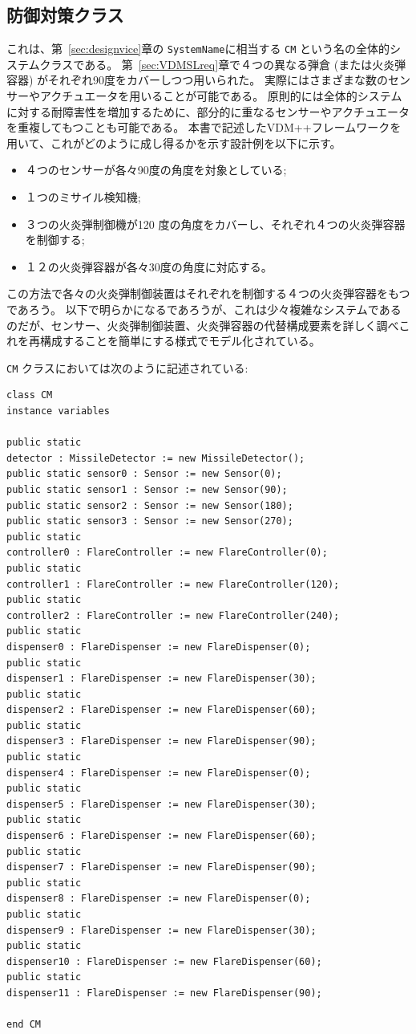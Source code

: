 \documentclass[\pformat,12pt]{jreport}
\begin{document}
\subsection{防御対策クラス}

これは、第~\ref{sec:designvice}章の \texttt{SystemName}に相当する \texttt{CM} という名の全体的システムクラスである。
第~\ref{sec:VDMSLreq}章で４つの異なる弾倉 (または火炎弾容器) がそれぞれ90度をカバーしつつ用いられた。
実際にはさまざまな数のセンサーやアクチュエータを用いることが可能である。
原則的には全体的システムに対する耐障害性を増加するために、部分的に重なるセンサーやアクチュエータを重複してもつことも可能である。
本書で記述したVDM++フレームワークを用いて、これがどのように成し得るかを示す設計例を以下に示す。
\begin{itemize}
\item ４つのセンサーが各々90度の角度を対象としている;
\item １つのミサイル検知機;
\item ３つの火炎弾制御機が120 度の角度をカバーし、それぞれ４つの火炎弾容器を制御する;
\item １２の火炎弾容器が各々30度の角度に対応する。
\end{itemize}

この方法で各々の火炎弾制御装置はそれぞれを制御する４つの火炎弾容器をもつであろう。
以下で明らかになるであろうが、これは少々複雑なシステムであるのだが、センサー、火炎弾制御装置、火炎弾容器の代替構成要素を詳しく調べこれを再構成することを簡単にする様式でモデル化されている。

\texttt{CM} クラスにおいては次のように記述されている:
\newpage

\begin{lstlisting}
class CM
instance variables

public static 
detector : MissileDetector := new MissileDetector();
public static sensor0 : Sensor := new Sensor(0);
public static sensor1 : Sensor := new Sensor(90);
public static sensor2 : Sensor := new Sensor(180);
public static sensor3 : Sensor := new Sensor(270);
public static 
controller0 : FlareController := new FlareController(0);
public static 
controller1 : FlareController := new FlareController(120);
public static 
controller2 : FlareController := new FlareController(240);
public static 
dispenser0 : FlareDispenser := new FlareDispenser(0);
public static 
dispenser1 : FlareDispenser := new FlareDispenser(30);
public static 
dispenser2 : FlareDispenser := new FlareDispenser(60);
public static 
dispenser3 : FlareDispenser := new FlareDispenser(90);
public static 
dispenser4 : FlareDispenser := new FlareDispenser(0);
public static 
dispenser5 : FlareDispenser := new FlareDispenser(30);
public static 
dispenser6 : FlareDispenser := new FlareDispenser(60);
public static 
dispenser7 : FlareDispenser := new FlareDispenser(90);
public static 
dispenser8 : FlareDispenser := new FlareDispenser(0);
public static 
dispenser9 : FlareDispenser := new FlareDispenser(30);
public static 
dispenser10 : FlareDispenser := new FlareDispenser(60);
public static 
dispenser11 : FlareDispenser := new FlareDispenser(90);

end CM
\end{lstlisting}
\end{document}
